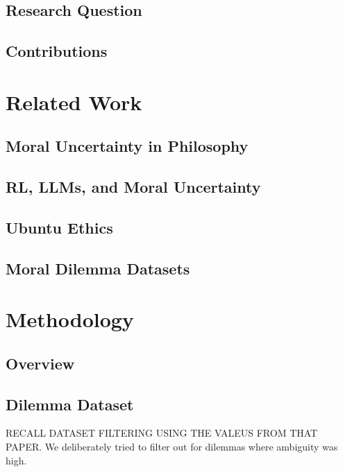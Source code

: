 \documentclass[10pt,twocolumn,a4paper]{article}
\begin{document}
\subsection{Research Question}

\subsection{Contributions}

\section{Related Work}

\subsection{Moral Uncertainty in Philosophy}

\subsection{RL, LLMs, and Moral Uncertainty}

\subsection{Ubuntu Ethics}

\subsection{Moral Dilemma Datasets}

\section{Methodology}

\subsection{Overview}

\subsection{Dilemma Dataset}
RECALL DATASET FILTERING USING THE VALEUS FROM THAT PAPER. We deliberately tried to filter out for dilemmas where ambiguity was high.
\end{document}
